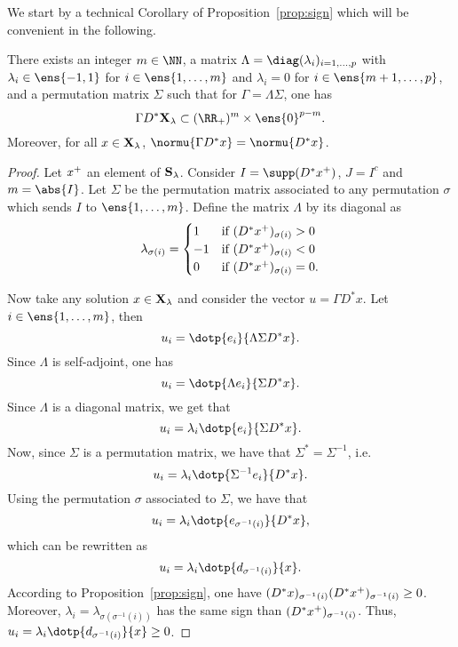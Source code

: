 We start by a technical Corollary of Proposition~\ref{prop:sign} which will be convenient in the following.
\begin{corollary}\label{cor:diagpos}
  There exists an integer $m \in \NN$, a matrix $\Lambda = \diag(\lambda_i)_{i=1,\dots,p}$ with $\lambda_i \in \ens{-1,1}$ for $i \in \ens{1,\dots,m}$ and $\lambda_i = 0$ for $i \in \ens{m+1,\dots,p}$, and a permutation matrix $\Sigma$ such that for $\Gamma = \Lambda \Sigma$, one has
  \begin{equation*}
    \Gamma D^* \Xl \subset (\RR_+)^m \times \ens{0}^{p-m} .
  \end{equation*}
  Moreover, for all $x \in \mathbf{X}_{\lambda}$, $\normu{\Gamma D^* x} = \normu{D^* x}$.
\end{corollary}
\begin{proof}
  Let $x^+$ an element of $\mathbf{S}_{\lambda}$.
  Consider $I = \supp(D^* \maxx)$, $J = I^c$ and $m = \abs{I}$.
  Let $\Sigma$ be the permutation matrix associated to any permutation $\sigma$ which sends $I$ to $\ens{1,\dots,m}$.
  Define the matrix $\Lambda$ by its diagonal as
  \begin{equation*}
    \lambda_{\sigma(i)} = 
    \begin{cases}
      1 & \text{if } (D^* x^+)_{\sigma(i)} > 0 \\
      -1 & \text{if } (D^* x^+)_{\sigma(i)} < 0 \\
      0 & \text{if } (D^* x^+)_{\sigma(i)} = 0 .
    \end{cases}
  \end{equation*}

  Now take any solution $x \in \mathbf{X}_{\lambda}$ and consider the vector $u = \Gamma D^* x$.
  Let $i \in \ens{1,\dots,m}$, then
  \begin{equation*}
    u_i = \dotp{e_i}{\Lambda \Sigma D^* x} .
  \end{equation*}
  Since $\Lambda$ is self-adjoint, one has
  \begin{equation*}
    u_i = \dotp{\Lambda e_i}{\Sigma D^* x} .
  \end{equation*}
  Since $\Lambda$ is a diagonal matrix, we get that
  \begin{equation*}
    u_i = \lambda_i \dotp{e_i}{\Sigma D^* x} .
  \end{equation*}
  Now, since $\Sigma$ is a permutation matrix, we have that $\Sigma^* = \Sigma^{-1}$, i.e.
  \begin{equation*}
    u_i = \lambda_i \dotp{\Sigma^{-1} e_i}{D^* x} .
  \end{equation*}
  Using the permutation $\sigma$ associated to $\Sigma$, we have that
  \begin{equation*}
    u_i = \lambda_i \dotp{e_{\sigma^{-1}(i)}}{D^* x} ,
  \end{equation*}
  which can be rewritten as
  \begin{equation*}
    u_i = \lambda_i \dotp{d_{\sigma^{-1}(i)}}{x} .
  \end{equation*}  
  According to Proposition~\ref{prop:sign}, one have $(D^* x)_{\sigma^{-1}(i)} (D^* x^+)_{\sigma^{-1}(i)} \geq 0$.
  Moreover, $\lambda_i = \lambda_{\sigma(\sigma^{-1}(i))}$ has the same sign than $(D^* x^+)_{\sigma^{-1}(i)}$.
  Thus, $u_i = \lambda_i \dotp{d_{\sigma^{-1}(i)}}{x} \geq 0$.


\end{proof}
